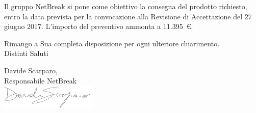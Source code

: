 \documentclass[11pt,a4paper]{letter}
\begin{document}
\begin{letter}
	Il gruppo NetBreak si pone come obiettivo la consegna del prodotto richiesto, entro la data prevista per la convocazione alla Revisione di Accettazione del 27 giugno 2017. L'importo del preventivo ammonta a \hbox{11.395 \euro{}.}

\noindent Rimango a Sua completa disposizione per ogni ulteriore chiarimento.\\
Distinti Saluti
	

\closing{Davide Scarparo,\\ Responsabile NetBreak\\ \includegraphics[width=1.8in]{DS.png}}


\end{letter}
\end{document}
